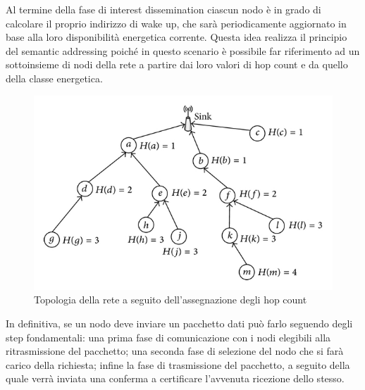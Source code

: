 \documentclass{report}
\begin{document}
Al termine della fase di interest dissemination ciascun nodo è in grado di calcolare il proprio indirizzo di wake up, che sarà periodicamente aggiornato in base alla loro
disponibilità energetica corrente. Questa idea realizza il principio del semantic addressing poiché in questo scenario
è possibile far riferimento ad un sottoinsieme di nodi della rete a partire dai loro valori di hop count e da quello della classe energetica. \\

\begin{figure}
    \begin{center}
        \includegraphics[scale=1.7]{hop-count-algorithm.png}
        \caption{Topologia della rete a seguito dell'assegnazione degli hop count}
    \end{center}
\end{figure}

In definitiva, se un nodo deve inviare un pacchetto dati può farlo seguendo degli step fondamentali: una prima fase di comunicazione con i nodi elegibili
alla ritrasmissione del pacchetto; una seconda fase di selezione del nodo che si farà carico della richiesta; infine la fase di trasmissione del pacchetto,
a seguito della quale verrà inviata una conferma a certificare l'avvenuta ricezione dello stesso.\\
\end{document}

